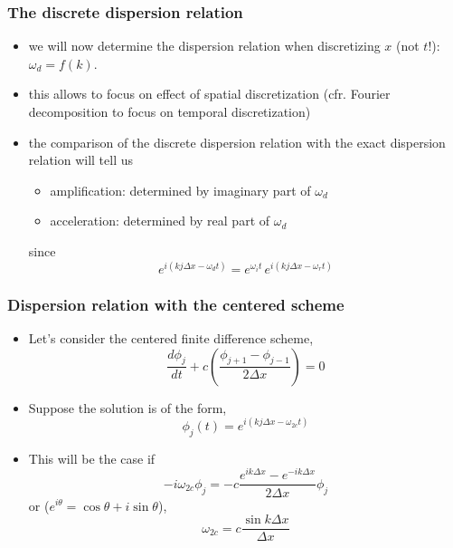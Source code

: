 \documentclass[aspectratio=149,9pt]{beamer}
\begin{document}
\begin{frame}
	\frametitle{The discrete dispersion relation}
	\vfill\begin{itemize}
		\item we will now determine the dispersion relation when discretizing $x$ (not $t$!): $\omega_d=f(k)$.\vfill
		\item this allows to focus on effect of spatial discretization (cfr. Fourier decomposition to focus on temporal discretization)\vfill
		\item the comparison of the discrete dispersion relation with the exact dispersion relation will tell us\vfill
			\begin{itemize}
				\item amplification: determined by imaginary part of $\omega_d$\vfill
				\item acceleration: determined by real part of $\omega_d$\vfill
			\end{itemize}
			since
			\begin{equation*}
				e^{i\left(k j \Delta x-\omega_d t\right)}=e^{\omega_i t}\,e^{i\left(kj\Delta x-\omega_r t\right)}
			\end{equation*}
	\end{itemize}\vfill
\end{frame}
%
%
\begin{frame}
	\frametitle{Dispersion relation with the centered scheme}
	\vfill\begin{itemize}
		\item Let's consider the centered finite difference scheme,
			\begin{equation*}
				\frac{ d \phi_j}{dt} + c 
				\left(
					\frac{\phi_{j+1} - \phi_{j-1}}{2 \Delta x}
				\right)
				= 0
			\end{equation*}\vfill
		\item Suppose the solution is of the form,
			\begin{equation*}
				\phi_j (t) = e^{i \left( k j \Delta x - \omega_{2c} t \right)}
			\end{equation*}\vfill
		\item This will be the case if
			\begin{equation*}
				- i \omega_{2c} \phi_j = - c
				\frac{e^{ik \Delta x} - e^{- i k \Delta x}}{2 \Delta x} \phi_j
			\end{equation*}
			or ($e^{i\theta}=\cos\theta+i\sin\theta$),
			\begin{equation*}
				\omega_{2c} = c \frac{\sin k \Delta x}{\Delta x}
			\end{equation*}
	\end{itemize}\vfill
\end{frame}
\end{document}
